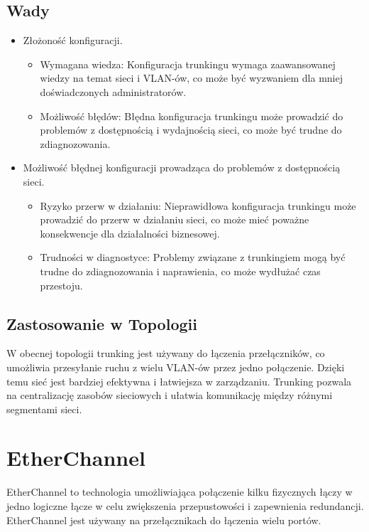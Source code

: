 \subsection{Wady}
\begin{itemize}
    \item Złożoność konfiguracji.
    \begin{itemize}
        \item Wymagana wiedza: Konfiguracja trunkingu wymaga zaawansowanej wiedzy na temat sieci i VLAN-ów, co może być wyzwaniem dla mniej doświadczonych administratorów.
        \item Możliwość błędów: Błędna konfiguracja trunkingu może prowadzić do problemów z dostępnością i wydajnością sieci, co może być trudne do zdiagnozowania.
    \end{itemize}
    \item Możliwość błędnej konfiguracji prowadząca do problemów z dostępnością sieci.
    \begin{itemize}
        \item Ryzyko przerw w działaniu: Nieprawidłowa konfiguracja trunkingu może prowadzić do przerw w działaniu sieci, co może mieć poważne konsekwencje dla działalności biznesowej.
        \item Trudności w diagnostyce: Problemy związane z trunkingiem mogą być trudne do zdiagnozowania i naprawienia, co może wydłużać czas przestoju.
    \end{itemize}
\end{itemize}

\subsection{Zastosowanie w Topologii}
W obecnej topologii trunking jest używany do łączenia przełączników, co umożliwia przesyłanie ruchu z wielu VLAN-ów przez jedno połączenie. Dzięki temu sieć jest bardziej efektywna i łatwiejsza w zarządzaniu. Trunking pozwala na centralizację zasobów sieciowych i ułatwia komunikację między różnymi segmentami sieci.

\section{EtherChannel}

EtherChannel to technologia umożliwiająca połączenie kilku fizycznych łączy w jedno logiczne łącze w celu zwiększenia przepustowości i zapewnienia redundancji. EtherChannel jest używany na przełącznikach do łączenia wielu portów.


